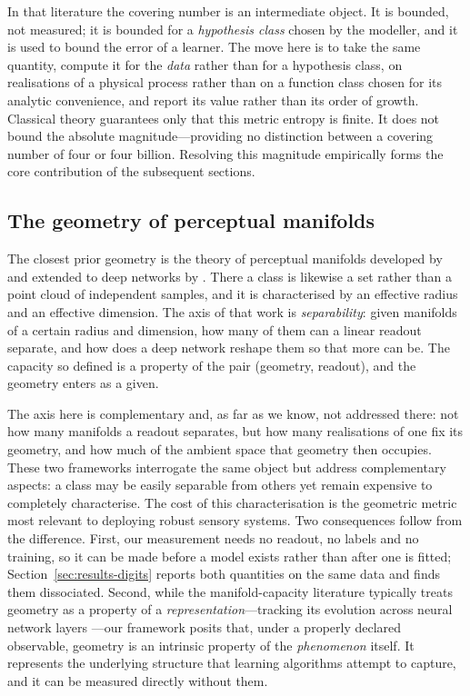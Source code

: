 \documentclass[10pt]{article}
\theoremstyle{plain}
\theoremstyle{definition}
\theoremstyle{remark}
\begin{document}
In that literature the covering number is an intermediate object. It is
bounded, not measured; it is bounded for a \emph{hypothesis class} chosen by
the modeller, and it is used to bound the error of a learner. The move here is
to take the same quantity, compute it for the \emph{data} rather than for a
hypothesis class, on realisations of a physical process rather than on a
function class chosen for its analytic convenience, and report its value rather
than its order of growth. Classical theory guarantees only that this metric
entropy is finite. It does not bound the absolute magnitude---providing no
distinction between a covering number of four or four billion. Resolving this
magnitude empirically forms the core contribution of the subsequent sections.

\subsection{The geometry of perceptual manifolds}
\label{sec:rw-manifolds}

The closest prior geometry is the theory of perceptual manifolds developed by
\citet{chung2018perceptual} and extended to deep
networks by \citet{cohen2020separability}. There a class is
likewise a set rather than a point cloud of independent samples, and it is
characterised by an effective radius and an effective dimension. The axis of
that work is \emph{separability}: given manifolds of a certain radius and
dimension, how many of them can a linear readout separate, and how does a deep
network reshape them so that more can be. The capacity so defined is a property
of the pair (geometry, readout), and the geometry enters as a given.

The axis here is complementary and, as far as we know, not addressed there: not
how many manifolds a readout separates, but how many realisations of one fix
its geometry, and how much of the ambient space that geometry then occupies.
These two frameworks interrogate the same object but address complementary
aspects: a class may be easily separable from others yet remain expensive to
completely characterise. The cost of this characterisation is the
geometric metric most relevant to deploying robust sensory systems. Two
consequences follow from the difference. First, our measurement needs no
readout, no labels and no training, so it can be made before a model exists
rather than after one is fitted; Section~\ref{sec:results-digits} reports both
quantities on the same data and finds them dissociated. Second, while the
manifold-capacity literature typically treats geometry as a property of a
\emph{representation}---tracking its evolution across neural network layers
\citep{cohen2020separability, ansuini2019intrinsic}---our framework posits that,
under a properly declared observable, geometry is an intrinsic property of the
\emph{phenomenon} itself. It represents the underlying structure that learning
algorithms attempt to capture, and it can be measured directly without them.
\end{document}
